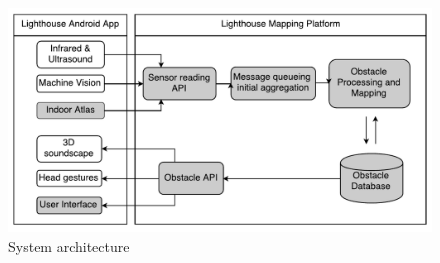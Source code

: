 \documentclass[prodmode,acmtosem]{acmsmall} %
\begin{document}


\begin{figure}
\label{fig:architecture}
\centering
\includegraphics[width=\textwidth]{ReportDiagram.pdf}
\caption{System architecture}
\end{figure}
\end{document}

